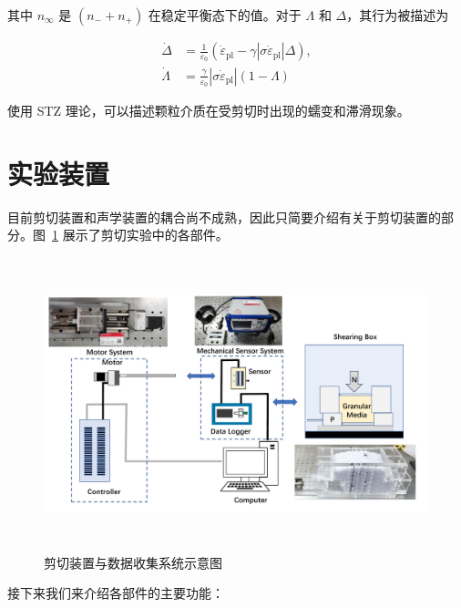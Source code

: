 其中 $n_{\infty}$ 是 $(n_{-} + n_{+})$ 在稳定平衡态下的值。对于 $\Lambda$ 和 $\Delta$，其行为被描述为

\begin{align}
  \dot{\Delta} &= \frac{1}{\varepsilon_{0}}\left(\dot{\varepsilon}_{\text{pl}} - \gamma|\sigma\dot{\varepsilon}_{\text{pl}}|\Delta\right),\\
  \dot{\Lambda} &= \frac{\gamma}{\varepsilon_{0}}\left|\sigma\dot{\varepsilon}_{\text{pl}}\right|(1-\Lambda)
\end{align}

使用 STZ 理论，可以描述颗粒介质在受剪切时出现的蠕变和滞滑现象。

\section{实验装置}

目前剪切装置和声学装置的耦合尚不成熟，因此只简要介绍有关于剪切装置的部分。图~\ref{fig:apparatus_2} 展示了剪切实验中的各部件。

\begin{figure}[!htp]
    \centering
    \includegraphics[height=8.5cm]{figures/4_apparatus.pdf}
    \caption{剪切装置与数据收集系统示意图}
    \label{fig:apparatus_2}
  \end{figure}

接下来我们来介绍各部件的主要功能：

